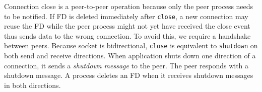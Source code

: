 
Connection close is a peer-to-peer operation because only the peer process needs to be notified. If FD is deleted immediately after \texttt{close}, a new connection may reuse the FD while the peer process might not yet have received the close event thus sends data to the wrong connection. To avoid this, we require a handshake between peers.
Because socket is bidirectional, \texttt{close} is equivalent to \texttt{shutdown} on both send and receive directions.
When application shuts down one direction of a connection, it sends a \textit{shutdown message} to the peer. The peer responds with a shutdown message. A process deletes an FD when it receives shutdown messages in both directions.



\fi




